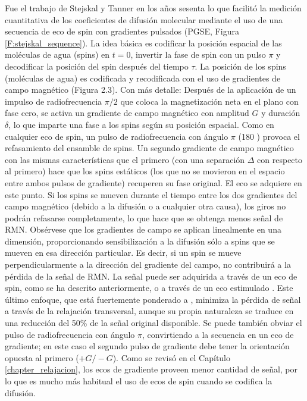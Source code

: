 Fue el trabajo de Stejskal y Tanner \cite{Stejskal_1965} en los años sesenta lo que facilitó la medición cuantitativa de los coeficientes de difusión molecular mediante el uso de una secuencia de eco de spin con gradientes pulsados (PGSE, Figura \ref{F:stejskal_sequence}). La idea básica es codificar la posición espacial de las moléculas de agua (spins) en $t = 0$, invertir la fase de spin con un pulso $\pi$ y decodificar la posición del spin después del tiempo $\tau$. La posición de los spins (moléculas de agua) es codificada y recodificada con el uso de gradientes de campo magnético (Figura 2.3). Con más detalle: Después de la aplicación de un impulso de radiofrecuencia $\pi/2$ que coloca la magnetización neta en el plano \Mxy con fase cero, se activa un gradiente de campo magnético con amplitud $G$ y duración $\delta$, lo que imparte una fase a los spins según su posición espacial. Como en cualquier eco de spin, un pulso de radiofrecuencia con ángulo $\pi$ (180 \degrees) provoca el refasamiento del ensamble de spins. Un segundo gradiente de campo magnético con las mismas características que el primero (con una separación $\Delta$ con respecto al primero) hace que los spins estáticos (los que no se movieron en el espacio entre ambos pulsos de gradiente) recuperen su fase original. El eco se adquiere en este punto. Si los spins se mueven durante el tiempo entre los dos gradientes del campo magnético (debido a la difusión o a cualquier otra causa), los giros no podrán refasarse completamente, lo que hace que se obtenga menos señal de RMN. Obsérvese que los gradientes de campo se aplican linealmente en una dimensión, proporcionando sensibilización a la difusión sólo a spins que se mueven en esa dirección particular. Es decir, si un spin se mueve perpendicularmente a la dirección del gradiente del campo, no contribuirá a la pérdida de la señal de RMN. La señal puede ser adquirida a través de un eco de spin, como se ha descrito anteriormente, o a través de un eco estimulado \cite{Tanner_1970}. Este último enfoque, que está fuertemente ponderado a \Tone, minimiza la pérdida de señal a través de la relajación transversal, aunque su propia naturaleza se traduce en una reducción del 50\% de la señal original disponible. Se puede también obviar el pulso de radiofrecuencia con ángulo $\pi$, convirtiendo a la secuencia en un eco de gradiente; en este caso el segundo pulso de gradiente debe tener la orientación opuesta al primero ($+G/-G$). Como se revisó en el Capítulo \ref{chapter_relajacion}, los ecos de gradiente proveen menor cantidad de señal, por lo que es mucho más habitual el uso de ecos de spin cuando se codifica la difusión.

